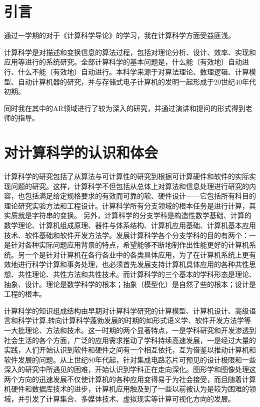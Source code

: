 \documentclass{article}
\begin{document}
\thispagestyle{empty}
\newpage
\setcounter{page}{1}
\section{引言}
通过一学期的对于《计算科学导论》的学习，我在计算科学方面受益匪浅。\par
计算科学是对描述和变换信息的算法过程，包括对理论分析、设计、效率、实现和应用等进行的系统研究。全部计算科学的基本问题是，什么能（有效地）自动进行、什么不能（有效地）自动进行。本科学来源于对算法理论、数理逻辑、计算模型、自动计算机器的研究，并与存储式电子计算机的发明一起形成于20世纪40年代初期。\par

同时我在其中的AR领域进行了较为深入的研究，并通过演讲和提问的形式得到老师的指导。\par

\section{对计算科学的认识和体会}
计算科学的研究包括了从算法与可计算性的研究到根据可计算硬件和软件的实际实现问题的研究。这样，计算科学不但包括从总体上对算法和信息处理进行研究的内容，也包括满足给定规格要求的有效而可靠的软、硬件设计——它包括所有科目的理论研究实验方法和工程设计。计算科学所有分支领域的根本任务是进行计算，其实质就是字符串的变换。
另外，计算科学的分支学科是构造性数学基础、计算的数学理论、计算机组成原理、器件与体系结构、计算机应用基础、计算机基本应用技术、软件基础和软件开发方法学。发展计算科学各个分支学科的目的有两个：一是针对各种实际问题应用背景的特点，希望能够不断地制作出性能更好的计算机系统。另一个是针对计算机在各行各业中的各类具体应用，为了在计算机系统上更有效地进行科学计算和事务处理，也必须首先发展支持计算机具体应用的各种共性思想、共性理论、共性方法和共性技术。而计算科学的三个基本的学科形态是理论、抽象、设计。理论是数学科学的根本；抽象（模型化）是自然了些的根本；设计是工程的根本。\par

计算科学的知识组成结构由早期对计算科学研究的计算模型、计算机设计、高级语言和科学计算,转向计算科学蓬勃发展的时期的如形式语义学、软件开发方法学等一大批理论、方法和技术。这一时期的两个显著特点，一是学科研究和开发渗透到社会生活的各个方面，广泛的应用需求推动了学科持续高速发展，一是经过大量的实践，人们开始认识到软件和硬件之间有一个相互依托，互为借鉴以推动计算机和软件发展的问题。从上世纪80年代起，针对集成电路芯片可预见的设计极限和一些深入的研究中所遇见的困难，开始认识到学科正在走向深化。图形学和图像处理这两个方向的迅速发展不仅使计算机的各种应用变得易于为社会接受，而且随着计算机硬件和数据库技术的进步，计算机应用触及到了一些以前被认为是较为困难的领域，并引发了计算集合、多媒体技术、虚拟现实等计算可视化方向的发展。\par
\end{document}
